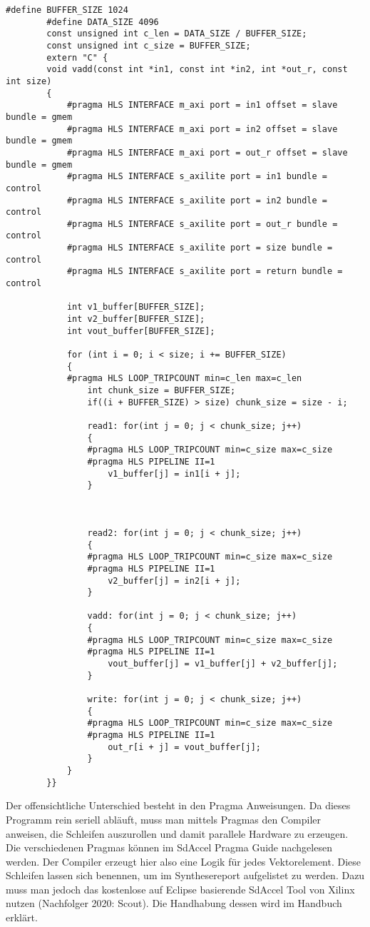 		\begin{lstlisting}[caption=FPGA: C Kernel]	
		#define BUFFER_SIZE 1024
		#define DATA_SIZE 4096
		const unsigned int c_len = DATA_SIZE / BUFFER_SIZE;
		const unsigned int c_size = BUFFER_SIZE;
		extern "C" {
		void vadd(const int *in1, const int *in2, int *out_r, const int size)
		{
			#pragma HLS INTERFACE m_axi port = in1 offset = slave bundle = gmem
			#pragma HLS INTERFACE m_axi port = in2 offset = slave bundle = gmem
			#pragma HLS INTERFACE m_axi port = out_r offset = slave bundle = gmem
			#pragma HLS INTERFACE s_axilite port = in1 bundle = control
			#pragma HLS INTERFACE s_axilite port = in2 bundle = control
			#pragma HLS INTERFACE s_axilite port = out_r bundle = control
			#pragma HLS INTERFACE s_axilite port = size bundle = control
			#pragma HLS INTERFACE s_axilite port = return bundle = control

			int v1_buffer[BUFFER_SIZE];
			int v2_buffer[BUFFER_SIZE];
			int vout_buffer[BUFFER_SIZE];

			for (int i = 0; i < size; i += BUFFER_SIZE) 
			{
			#pragma HLS LOOP_TRIPCOUNT min=c_len max=c_len
				int chunk_size = BUFFER_SIZE;
				if((i + BUFFER_SIZE) > size) chunk_size = size - i;
				
				read1: for(int j = 0; j < chunk_size; j++) 
				{
				#pragma HLS LOOP_TRIPCOUNT min=c_size max=c_size
				#pragma HLS PIPELINE II=1
					v1_buffer[j] = in1[i + j];
				}



				read2: for(int j = 0; j < chunk_size; j++) 
				{
				#pragma HLS LOOP_TRIPCOUNT min=c_size max=c_size
				#pragma HLS PIPELINE II=1
					v2_buffer[j] = in2[i + j];
				}

				vadd: for(int j = 0; j < chunk_size; j++) 
				{
				#pragma HLS LOOP_TRIPCOUNT min=c_size max=c_size
				#pragma HLS PIPELINE II=1
					vout_buffer[j] = v1_buffer[j] + v2_buffer[j];
				}

				write: for(int j = 0; j < chunk_size; j++) 
				{
				#pragma HLS LOOP_TRIPCOUNT min=c_size max=c_size
				#pragma HLS PIPELINE II=1
					out_r[i + j] = vout_buffer[j];
				}
			}
		}}
		\end{lstlisting}		
		
		Der offensichtliche Unterschied besteht in den Pragma Anweisungen. Da dieses Programm rein seriell abläuft, muss man mittels Pragmas den Compiler anweisen, die Schleifen auszurollen und damit parallele Hardware zu erzeugen. Die verschiedenen Pragmas können im SdAccel Pragma Guide \autocite{pragma} nachgelesen werden. Der Compiler erzeugt hier also eine Logik für jedes Vektorelement. Diese Schleifen lassen sich benennen, um im Synthesereport aufgelistet zu werden. Dazu muss man jedoch das kostenlose auf Eclipse basierende SdAccel Tool von Xilinx nutzen (Nachfolger 2020: Scout). Die Handhabung dessen wird im Handbuch erklärt. \autocite{sdaccel}
		
